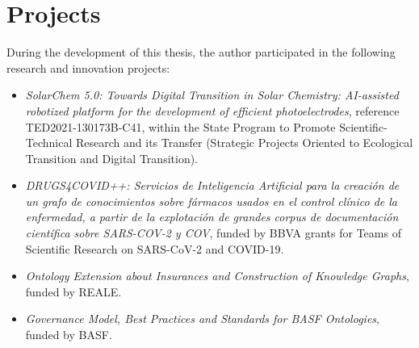 \section{Projects}
During the development of this thesis, the author participated in the following research and innovation projects:

\begin{itemize}
    \item \textit{SolarChem 5.0: Towards Digital Transition in Solar Chemistry: AI-assisted robotized platform for the development of efficient photoelectrodes}, reference TED2021-130173B-C41, within the State Program to Promote Scientific-Technical Research and its Transfer (Strategic Projects Oriented to Ecological Transition and Digital Transition).

    \item \textit{DRUGS4COVID++: Servicios de Inteligencia Artificial para la creación de un grafo de conocimientos sobre fármacos usados en el control clínico de la enfermedad, a partir de la explotación de grandes corpus de documentación científica sobre SARS-COV-2 y COV}, funded by BBVA grants for Teams of Scientific Research on SARS-CoV-2 and COVID-19.

    \item \textit{Ontology Extension about Insurances and Construction of Knowledge Graphs}, funded by REALE. 
    
    \item \textit{Governance Model, Best Practices and Standards for BASF Ontologies}, funded by BASF. 
\end{itemize}